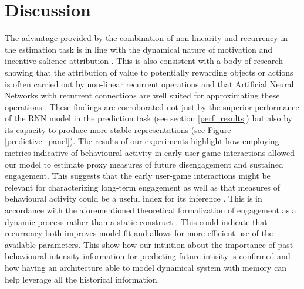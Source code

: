 \section{Discussion}
The advantage provided by the combination of non-linearity and recurrency in the estimation task is in line with the dynamical nature of motivation and incentive salience attribution \cite{toates1994comparing,robinson1993neural,zhang2009neural,tindell2009dynamic,berridge2012prediction}. This is also consistent with a body of research showing that the attribution of value to potentially rewarding objects or actions is often carried out by non-linear recurrent operations \cite{song2017reward,wang2018prefrontal} and that Artificial Neural Networks with recurrent connections are well suited for approximating these operations \cite{kietzmann2018deep}. These findings are corroborated not just by the superior performance of the RNN model in the prediction task (see section \ref{perf_results}) but also by its capacity to produce more stable representations (see Figure \ref{predictive_panel}).
The results of our experiments highlight how employing metrics indicative of behavioural activity in early user-game interactions allowed our model to estimate proxy measures of future disengagement and sustained engagement. This suggests that the early user-game interactions might be relevant for characterizing long-term engagement as well as that measures of behavioural activity could be a useful index for its inference \cite{milovsevic2017early, mirza2013does}.
This is in accordance with the aforementioned theoretical formalization of engagement as a dynamic process rather than a static construct \cite{o2008user}. 
This could indicate that recurrency both improves model fit and allows for more efficient use of the available parameters.
This show how our intuition about the importance of past behavioural intensity information for predicting future intisity is confirmed and how having an architecture able to model dynamical system with memory can help leverage all the historical information. 

